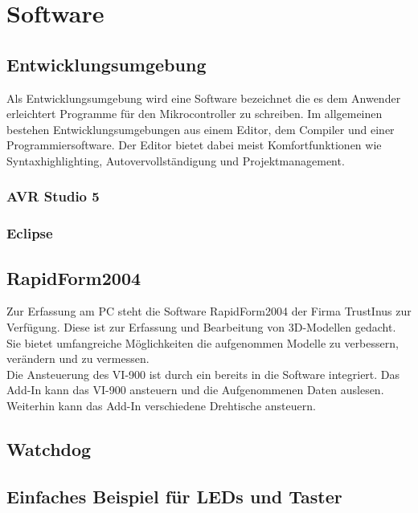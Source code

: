 \chapter{Software}
\label{cha:Software}
\section{Entwicklungsumgebung}
Als Entwicklungsumgebung wird eine Software bezeichnet die es dem Anwender erleichtert Programme für den Mikrocontroller zu schreiben. Im allgemeinen bestehen Entwicklungsumgebungen aus einem Editor, dem Compiler und einer Programmiersoftware. Der Editor bietet dabei meist Komfortfunktionen wie Syntaxhighlighting, Autovervollständigung und Projektmanagement.  
\subsection{AVR Studio 5}
\subsection{Eclipse}

\lstset{language=Java, basicstyle=\footnotesize, showstringspaces=false, tabsize=2}

\section{RapidForm2004}
\label{sec:RapidForm}
Zur Erfassung am PC steht die Software RapidForm2004 der Firma TrustInus zur Verfügung. Diese ist zur Erfassung und Bearbeitung von 3D-Modellen gedacht. Sie bietet umfangreiche Möglichkeiten die aufgenommen Modelle zu verbessern, verändern und zu vermessen.\\
Die Ansteuerung des VI-900 ist durch ein  bereits in die Software integriert. Das Add-In kann das VI-900 ansteuern und die Aufgenommenen Daten auslesen. Weiterhin kann das Add-In verschiedene Drehtische ansteuern.
\section{Watchdog}
\section{Einfaches Beispiel für LEDs und Taster}
